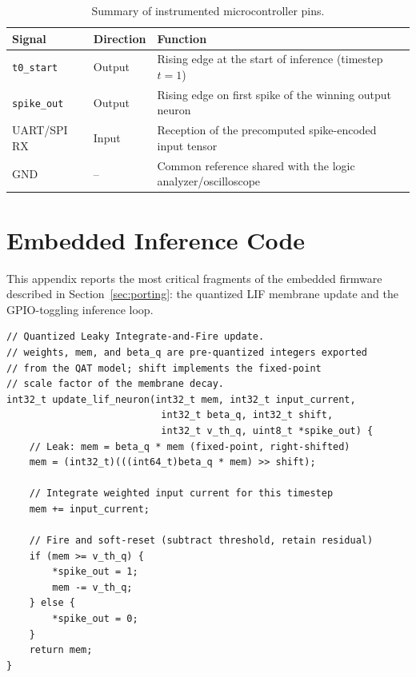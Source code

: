 \begin{table}[H]
\centering
\caption[Pinout summary]{Summary of instrumented microcontroller pins.}
\label{tab:pinout}
\small
\begin{tabular}{@{}llp{7.2cm}@{}}
\toprule
\textbf{Signal} & \textbf{Direction} & \textbf{Function} \\
\midrule
\texttt{t0\_start} & Output & Rising edge at the start of inference (timestep $t=1$) \\
\texttt{spike\_out} & Output & Rising edge on first spike of the winning output neuron \\
UART/SPI RX & Input  & Reception of the precomputed spike-encoded input tensor \\
GND         & --     & Common reference shared with the logic analyzer/oscilloscope \\
\bottomrule
\end{tabular}
\end{table}

\chapter{Embedded Inference Code}
\label{app:code}

This appendix reports the most critical fragments of the embedded firmware described in Section~\ref{sec:porting}: the quantized LIF membrane update and the GPIO-toggling inference loop.

\begin{lstlisting}[caption={Quantized LIF membrane update (fixed-point arithmetic).}, label={lst:qlif}]
// Quantized Leaky Integrate-and-Fire update.
// weights, mem, and beta_q are pre-quantized integers exported
// from the QAT model; shift implements the fixed-point
// scale factor of the membrane decay.
int32_t update_lif_neuron(int32_t mem, int32_t input_current,
                           int32_t beta_q, int32_t shift,
                           int32_t v_th_q, uint8_t *spike_out) {
    // Leak: mem = beta_q * mem (fixed-point, right-shifted)
    mem = (int32_t)(((int64_t)beta_q * mem) >> shift);

    // Integrate weighted input current for this timestep
    mem += input_current;

    // Fire and soft-reset (subtract threshold, retain residual)
    if (mem >= v_th_q) {
        *spike_out = 1;
        mem -= v_th_q;
    } else {
        *spike_out = 0;
    }
    return mem;
}
\end{lstlisting}


